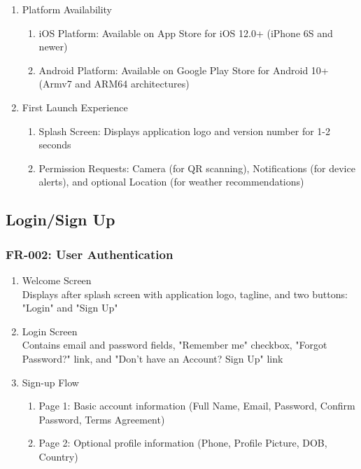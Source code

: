 \documentclass[conference]{IEEEtran}
\begin{document}
\begin{enumerate}
\item Platform Availability
    \begin{enumerate}
    \item iOS Platform: Available on App Store for iOS 12.0+ (iPhone 6S and newer)
    \item Android Platform: Available on Google Play Store for Android 10+ (Armv7 and ARM64 architectures)
    \end{enumerate}

\item First Launch Experience
    \begin{enumerate}
    \item Splash Screen: Displays application logo and version number for 1-2 seconds
    \item Permission Requests: Camera (for QR scanning), Notifications (for device alerts), and optional Location (for weather recommendations)
    \end{enumerate}
\end{enumerate}

\subsection{\textbf{Login/Sign Up}}

\subsubsection{FR-002: User Authentication}

\begin{enumerate}
\item Welcome Screen\\
Displays after splash screen with application logo, tagline, and two buttons: "Login" and "Sign Up"

\item Login Screen\\
Contains email and password fields, "Remember me" checkbox, "Forgot Password?" link, and "Don't have an Account? Sign Up" link

\item Sign-up Flow
    \begin{enumerate}
    \item Page 1: Basic account information (Full Name, Email, Password, Confirm Password, Terms Agreement)
    \item Page 2: Optional profile information (Phone, Profile Picture, DOB, Country)
    \end{enumerate}
\end{enumerate}
\end{document}
